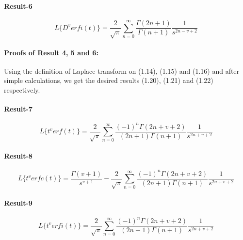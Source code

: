\documentclass{article}
\begin{document}
\paragraph{Result-6}
\begin{equation}
    L\big\{{D^v}erfi(t)\big\} = 
    \frac{2}{\sqrt{\pi}}
    \sum_{n = 0}^{\infty}
    \frac{\Gamma{(2n+1)}}{\Gamma{(n+1)}}
    \frac{1}{s^{2n-v+2}}
\end{equation}
\paragraph{Proofs of Result 4, 5 and 6:}
Using the definition of Laplace transform on (1.14), (1.15) and (1.16) and after simple calculations, we get the desired results (1.20), (1.21) and (1.22) respectively.

\paragraph{Result-7}
\begin{equation}
    L\big\{{t^v}erf(t)\big\} = 
    \frac{2}{\sqrt{\pi}}
    \sum_{n = 0}^{\infty}
    \frac{{(-1)}^n\Gamma{(2n+v+2)}}{(2n+1)\Gamma{(n+1)}}
    \frac{1}{s^{2n+v+2}}
\end{equation}
\paragraph{Result-8\\}
\begin{equation}
    L\big\{{t^v}erfc(t)\big\}=
    \frac{\Gamma{(v+1)}}{s^{v+1}}
    -\frac{2}{\sqrt{\pi}}
    \sum_{n = 0}^{\infty}
    \frac{{(-1)}^n\Gamma{(2n+v+2)}}{(2n+1)\Gamma{(n+1)}}
    \frac{1}{s^{2n+v+2}}
\end{equation}
\paragraph{Result-9}
\begin{equation}
    L\big\{{t^v}erfi(t)\big\} = 
    \frac{2}{\sqrt{\pi}}
    \sum_{n = 0}^{\infty}
    \frac{{(-1)}^n\Gamma{(2n+v+2)}}{(2n+1)\Gamma{(n+1)}}
    \frac{1}{s^{2n+v+2}}
\end{equation}
\end{document}
